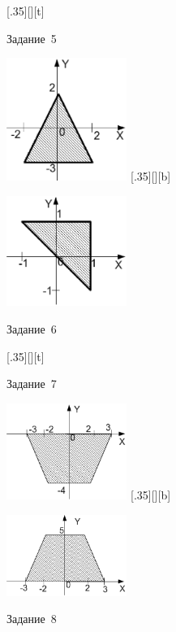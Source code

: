 \begin{figure}[H]
\begin{floatrow}
[.35\textwidth][\FBheight][t]
{\caption{Задание~5}
\label{ch03:refDrawing67}}
{\includegraphics[width=0.35\textwidth,keepaspectratio]{img/ris_3_68}}%
%
[.35\textwidth][\FBheight][b]
{\caption{Задание~6}
\label{ch03:refDrawing68}}
{\includegraphics[width=0.35\textwidth]{img/ris_3_69}}
\end{floatrow}
\end{figure}

\begin{figure}[H]
\begin{floatrow}
[.35\textwidth][\FBheight][t]
{\caption{Задание~7}
\label{ch03:refDrawing69}}
{\includegraphics[width=0.35\textwidth,keepaspectratio]{img/ris_3_70}}%
%
[.35\textwidth][\FBheight][b]
{\caption{Задание~8}
\label{ch03:refDrawing70}}
{\includegraphics[width=0.35\textwidth]{img/ris_3_71}}
\end{floatrow}
\end{figure}

